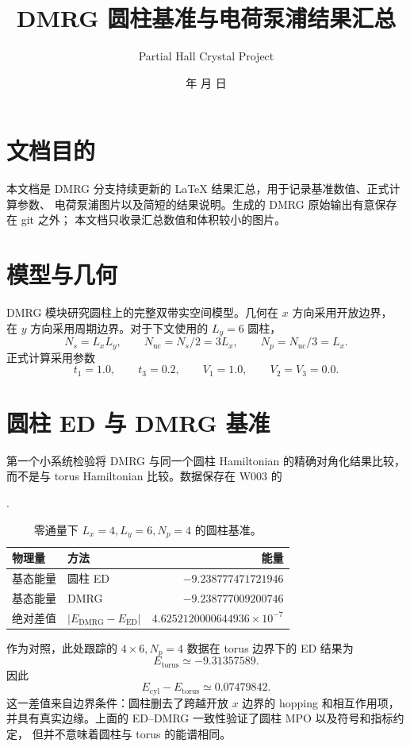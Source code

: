 \documentclass[11pt]{article}
\title{DMRG 圆柱基准与电荷泵浦结果汇总}
\author{Partial Hall Crystal Project}
\date{\number\year 年 \number\month 月 \number\day 日}
\begin{document}
\maketitle

\section{文档目的}

本文档是 DMRG 分支持续更新的 LaTeX 结果汇总，用于记录基准数值、正式计算参数、
电荷泵浦图片以及简短的结果说明。生成的 DMRG 原始输出有意保存在 git 之外；
本文档只收录汇总数值和体积较小的图片。

\section{模型与几何}

DMRG 模块研究圆柱上的完整双带实空间模型。几何在 \(x\) 方向采用开放边界，
在 \(y\) 方向采用周期边界。对于下文使用的 \(L_y=6\) 圆柱，
\[
  N_s = L_x L_y, \qquad N_{\mathrm{uc}} = N_s/2 = 3L_x,
  \qquad N_p = N_{\mathrm{uc}}/3 = L_x .
\]
正式计算采用参数
\[
  t_1=1.0,\qquad t_3=0.2,\qquad V_1=1.0,\qquad V_2=V_3=0.0 .
\]

\section{圆柱 ED 与 DMRG 基准}

第一个小系统检验将 DMRG 与同一个圆柱 Hamiltonian 的精确对角化结果比较，
而不是与 torus Hamiltonian 比较。数据保存在 W003 的
\begin{center}
\small{}.
\end{center}

\begin{table}[h]
\centering
\caption{零通量下 \(L_x=4,L_y=6,N_p=4\) 的圆柱基准。}
\begin{tabular}{llr}
\toprule
物理量 & 方法 & 能量 \\
\midrule
基态能量 & 圆柱 ED & \(-9.238777471721946\) \\
基态能量 & DMRG & \(-9.238777009200746\) \\
绝对差值 & \(|E_{\mathrm{DMRG}}-E_{\mathrm{ED}}|\) & \(4.6252120000644936\times 10^{-7}\) \\
\bottomrule
\end{tabular}
\end{table}

作为对照，此处跟踪的 \(4\times6,N_p=4\) 数据在 torus 边界下的 ED 结果为
\[
  E_{\mathrm{torus}} \simeq -9.31357589 .
\]
因此
\[
  E_{\mathrm{cyl}} - E_{\mathrm{torus}}
  \simeq 0.07479842 .
\]
这一差值来自边界条件：圆柱删去了跨越开放 \(x\) 边界的 hopping 和相互作用项，
并具有真实边缘。上面的 ED--DMRG 一致性验证了圆柱 MPO 以及符号和指标约定，
但并不意味着圆柱与 torus 的能谱相同。
\end{document}
